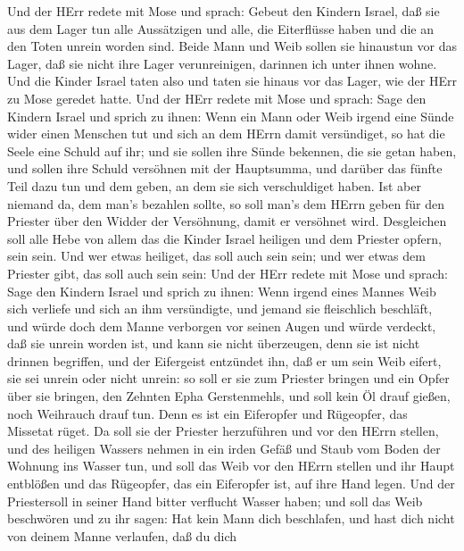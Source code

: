  Und der HErr redete mit Mose und sprach: 
Gebeut den Kindern Israel, daß sie aus dem Lager tun alle Aussätzigen
und alle, die Eiterflüsse haben und die an den Toten unrein worden sind.
 Beide Mann und Weib sollen sie hinaustun vor das Lager, daß
sie nicht ihre Lager verunreinigen, darinnen ich unter ihnen wohne.
 Und die Kinder Israel taten also und taten sie hinaus vor
das Lager, wie der HErr zu Mose geredet hatte.  Und der HErr
redete mit Mose und sprach:  Sage den Kindern Israel und
sprich zu ihnen: Wenn ein Mann oder Weib irgend eine Sünde wider einen
Menschen tut und sich an dem HErrn damit versündiget, so hat die Seele
eine Schuld auf ihr;  und sie sollen ihre Sünde bekennen,
die sie getan haben, und sollen ihre Schuld versöhnen mit der
Hauptsumma, und darüber das fünfte Teil dazu tun und dem geben, an dem
sie sich verschuldiget haben.  Ist aber niemand da, dem
man's bezahlen sollte, so soll man's dem HErrn geben für den Priester
über den Widder der Versöhnung, damit er versöhnet wird. 
Desgleichen soll alle Hebe von allem das die Kinder Israel heiligen und
dem Priester opfern, sein sein.  Und wer etwas heiliget,
das soll auch sein sein; und wer etwas dem Priester gibt, das soll auch
sein sein:  Und der HErr redete mit Mose und sprach:
 Sage den Kindern Israel und sprich zu ihnen: Wenn irgend
eines Mannes Weib sich verliefe und sich an ihm versündigte,
 und jemand sie fleischlich beschläft, und würde doch dem
Manne verborgen vor seinen Augen und würde verdeckt, daß sie unrein
worden ist, und kann sie nicht überzeugen, denn sie ist nicht drinnen
begriffen,  und der Eifergeist entzündet ihn, daß er um
sein Weib eifert, sie sei unrein oder nicht unrein:  so
soll er sie zum Priester bringen und ein Opfer über sie bringen, den
Zehnten Epha Gerstenmehls, und soll kein Öl drauf gießen, noch Weihrauch
drauf tun. Denn es ist ein Eiferopfer und Rügeopfer, das Missetat rüget.
 Da soll sie der Priester herzuführen und vor den HErrn
stellen,  und des heiligen Wassers nehmen in ein irden
Gefäß und Staub vom Boden der Wohnung ins Wasser tun,  und
soll das Weib vor den HErrn stellen und ihr Haupt entblößen und das
Rügeopfer, das ein Eiferopfer ist, auf ihre Hand legen. Und der
Priestersoll in seiner Hand bitter verflucht Wasser haben; 
und soll das Weib beschwören und zu ihr sagen: Hat kein Mann dich
beschlafen, und hast dich nicht von deinem Manne verlaufen, daß du dich
